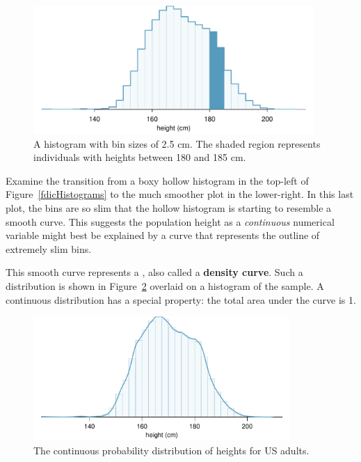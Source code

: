 \begin{figure}
\centering
\includegraphics[width=0.95\textwidth]{ch_probability/figures/usHeightsHist180185/usHeightsHist180185}
\caption{A histogram with bin sizes of 2.5 cm. The shaded region represents individuals with heights between 180 and 185 cm.}
\label{usHeightsHist180185}
\end{figure}

\D{\newpage}

Examine the transition from a boxy hollow histogram in the top-left of Figure~\ref{fdicHistograms} to the much smoother plot in the lower-right. In this last plot, the bins are so slim that the hollow histogram is starting to resemble a smooth curve. This suggests the population height as a \emph{continuous} numerical variable might best be explained by a curve that represents the outline of extremely slim bins.

This smooth curve represents a , also called a \textbf{density curve}.  Such a distribution is shown in Figure~\ref{fdicHeightContDist} overlaid on a histogram of the sample. A  continuous distribution has a special property: the total area under the curve is 1.

\begin{figure}[tbh]
\centering
\includegraphics[width=0.87\textwidth]{ch_probability/figures/fdicHeightContDist/fdicHeightContDist}
\caption{The continuous probability distribution of heights for US adults.}
\label{fdicHeightContDist}
\end{figure}

